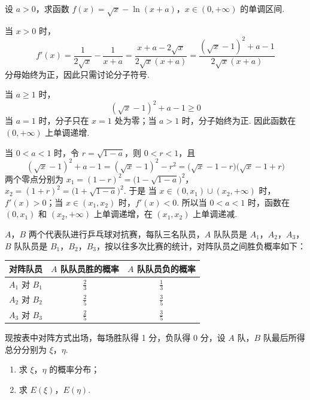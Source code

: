 \begin{problem}
设 \(a > 0\)，求函数 \(f(x) = \sqrt{x} - \ln (x + a)\)，\(x \in (0, +\infty)\) 的单调区间.
\end{problem}

\begin{solution}
当 \(x>0\) 时，
\[
f'(x)=\frac{1}{2\sqrt{x}}-\frac{1}{x+a}
=\frac{x+a-2\sqrt{x}}{2\sqrt{x}(x+a)}
=\frac{(\sqrt{x}-1)^{2}+a-1}{2\sqrt{x}(x+a)}
\]
分母始终为正，因此只需讨论分子符号.

当 \(a\geqslant1\) 时，
\[
(\sqrt{x}-1)^{2}+a-1\geqslant0
\]
当 \(a=1\) 时，分子只在 \(x=1\) 处为零；当 \(a>1\) 时，分子始终为正. 因此函数在 \((0,+\infty)\) 上单调递增.

当 \(0<a<1\) 时，令 \(r=\sqrt{1-a}\)，则 \(0<r<1\)，且
\[
(\sqrt{x}-1)^{2}+a-1=(\sqrt{x}-1)^{2}-r^{2}
=\bigl(\sqrt{x}-1-r\bigr)\bigl(\sqrt{x}-1+r\bigr)
\]
两个零点分别为 \(x_{1}=(1-r)^{2}=\bigl(1-\sqrt{1-a}\bigr)^{2}\)，\(x_{2}=(1+r)^{2}=\bigl(1+\sqrt{1-a}\bigr)^{2}\).
于是
当 \(x\in(0,x_{1})\cup(x_{2},+\infty)\) 时，\(f'(x)>0\)；当 \(x\in(x_{1},x_{2})\) 时，\(f'(x)<0\).
所以当 \(0<a<1\) 时，函数在 \((0,x_{1})\) 和 \((x_{2},+\infty)\) 上单调递增，在 \((x_{1},x_{2})\) 上单调递减.
\end{solution}

\begin{problem}
\(A\)，\(B\) 两个代表队进行乒乓球对抗赛，每队三名队员，\(A\) 队队员是 \(A_1\)，\(A_2\)，\(A_3\)，\(B\) 队队员是 \(B_1\)，\(B_2\)，\(B_3\)，按以往多次比赛的统计，对阵队员之间胜负概率如下：

\begin{center}
\begin{tabular}{|c|c|c|}
\hline
对阵队员 & \(A\) 队队员胜的概率 & \(A\) 队队员负的概率 \\
\hline
\(A_1\) 对 \(B_1\) & \(\frac{2}{3}\) & \(\frac{1}{3}\) \\
\hline
\(A_2\) 对 \(B_2\) & \(\frac{2}{5}\) & \(\frac{3}{5}\) \\
\hline
\(A_3\) 对 \(B_3\) & \(\frac{2}{5}\) & \(\frac{3}{5}\) \\
\hline
\end{tabular}
\end{center}

现按表中对阵方式出场，每场胜队得 1 分，负队得 0 分，设 \(A\) 队，\(B\) 队最后所得总分分别为 \(\xi\)，\(\eta\).

\begin{enumerate}
\item 求 \(\xi\)，\(\eta\) 的概率分布；
\item 求 \(E(\xi)\)，\(E(\eta)\).
\end{enumerate}
\end{problem}

